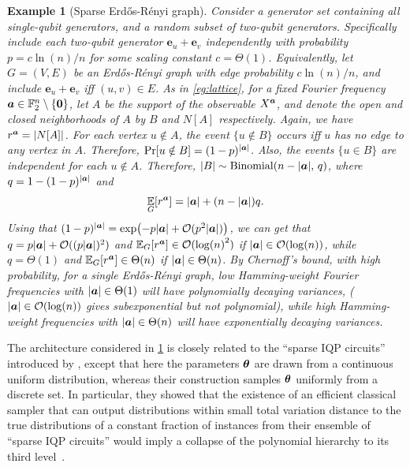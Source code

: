 \documentclass{article}
\theoremstyle{plain}
\newtheorem{example}[theorem]{Example}
\theoremstyle{definition}
\theoremstyle{remark}
\begin{document}
\begin{example}[Sparse Erd\H os-R\'enyi graph]
\label{eg:sparse}
Consider a generator set containing all single-qubit generators, and a random subset of two-qubit generators. Specifically include each two-qubit generator $\bm{e}_u+\bm{e}_v$ independently with probability $p=c \ln(n)/n$ for some scaling constant $c=\Theta(1)$. Equivalently, let $G=(V,E)$ be an Erd\H os-R\'enyi graph with edge probability $c \ln(n)/n$, and include $\bm{e}_u+\bm{e}_v$ iff $(u,v)\in E$. As in \cref{eg:lattice}, for a fixed Fourier frequency ${\bm{a}} \in \mathbb{F}_2^n \setminus \{\bm{0}\}$, let $A$ be the support of the observable $X^{\bm{a}}$, and denote the open and closed neighborhoods of $A$ by $B$ and $N[A]$ respectively. Again, we have $r^{\bm{a}} = \abs{N[A]}$. For each vertex $u\notin A$, the event $\{u\notin B\}$ occurs iff $u$ has no edge to any vertex in $A$. Therefore, $\Pr[u\notin B] = (1-p)^{\abs{{\bm{a}}}}$.
Also, the events $\{u\in B\}$ are independent for each $u \notin A$.
Therefore, $\abs{B} \sim \mathrm{Binomial}(n-\abs{{\bm{a}}},\,q)$, 
where $q = 1-(1-p)^{\abs{{\bm{a}}}}$ and \begin{equation}\operatorname*{\mathbb{E}}_G[r^{\bm{a}}] = \abs{{\bm{a}}} + (n-\abs{{\bm{a}}})q. \label{eq:sparse-rank}
\end{equation}
Using that $(1-p)^\abs{{\bm{a}}} = \exp(-p\abs{{\bm{a}}} + \mathcal{O}(p^2\abs{{\bm{a}}}))$, we can get that $q=p\abs{{\bm{a}}} + \mathcal{O}((p\abs{{\bm{a}}})^2)$ and $\operatorname*{\mathbb{E}}_G[r^{\bm{a}}] \in \mathcal{O}(\log(n)^2)$ if $\abs{{\bm{a}}} \in \mathcal{O}(\log(n))$, while $q = \Theta(1)$ and $\operatorname*{\mathbb{E}}_G[r^{\bm{a}}] \in \Theta(n)$ if $\abs{{\bm{a}}} \in \Theta(n)$. By Chernoff's bound, with high probability, for a single Erd\H os-R\'enyi graph, low Hamming-weight Fourier frequencies with $\abs{{\bm{a}}} \in \Theta(1)$ will have polynomially decaying variances, ($\abs{{\bm{a}}} \in \mathcal{O}(\log(n))$ gives subexponential but not polynomial), while high Hamming-weight frequencies with $\abs{{\bm{a}}} \in \Theta(n)$ will have exponentially decaying variances.
\end{example}

The architecture considered in \cref{eg:sparse} is closely related to the ``sparse IQP circuits'' introduced by \citet{Bremner17}, except that here the parameters ${\bm{\theta}}$ are drawn from a continuous uniform distribution, whereas their construction samples ${\bm{\theta}}$ uniformly from a discrete set. In particular, they showed that the existence of an efficient classical sampler that can output distributions within small total variation distance to the true distributions of a constant fraction of instances from their ensemble of ``sparse IQP circuits'' would imply a collapse of the polynomial hierarchy to its third level~\citep{Bremner17}.
\end{document}
